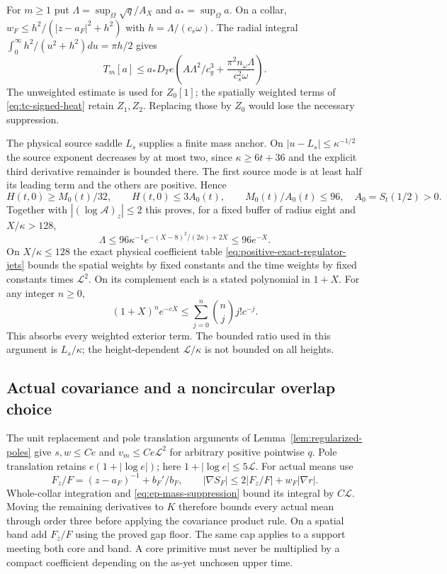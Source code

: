 For $m\ge1$ put $\Lambda=\sup_\Omega\sqrt q/A_X$ and
$a_*=\sup_\Omega a$. On a collar,
$w_F\le h^2/(|z-a_F|^2+h^2)$ with $h=\Lambda/(c_s\omega)$.
The radial integral $\int_0^\infty h^2/(u^2+h^2)du=\pi h/2$ gives
\begin{equation}
 T_m[a]\le a_*D_T e\left(
       A\Lambda^2/c_g^3+\frac{\pi^2 n_\omega\Lambda}{c_s^2\omega}\right).
 \label{eq:ep-weighted-primitive}
\end{equation}
The unweighted estimate is used for $Z_0[1]$; the spatially weighted
terms of \eqref{eq:tc-signed-heat} retain $Z_1,Z_2$.
Replacing those by $Z_0$ would lose the necessary suppression.

The physical source saddle $L_s$ supplies a finite mass anchor.
On $|u-L_s|\le\kappa^{-1/2}$ the source exponent decreases by at
most two, since $\kappa\ge6t+36$ and the explicit third derivative
remainder is bounded there. The first source mode is at least half its
leading term and the others are positive. Hence
\[
 H(t,0)\ge M_0(t)/32,\qquad
 H(t,0)\le3A_0(t),\qquad M_0(t)/A_0(t)\le96,
 \quad A_0=S_t(1/2)>0.
\]
Together with $|(\log\mathcal A)_z|\le2$ this proves, for a fixed
buffer of radius eight and $X/\kappa>128$,
\begin{equation}
 \Lambda\le96\kappa^{-1}
 e^{-(X-8)^2/(2\kappa)+2X}\le96e^{-X}.
 \label{eq:ep-mass-suppression}
\end{equation}
On $X/\kappa\le128$ the exact physical coefficient table
\eqref{eq:positive-exact-regulator-jets} bounds the spatial weights by
fixed constants and the time weights by fixed constants times
$\mathcal L^2$. On its complement each is a stated polynomial in
$1+X$. For any integer $n\ge0$,
\[
 (1+X)^n e^{-cX}\le\sum_{j=0}^n\binom njj!c^{-j}.
\]
This absorbs every weighted exterior term. The bounded ratio used in
this argument is $L_s/\kappa$; the height-dependent
$\mathcal L/\kappa$ is not bounded on all heights.

\subsection{Actual covariance and a noncircular overlap choice}
The unit replacement and pole translation arguments of
Lemma~\ref{lem:regularized-poles} give $s,w\le C e$ and
$v_m\le C e\mathcal L^2$ for arbitrary positive pointwise $q$.
Pole translation retains $e(1+|\log e|)$; here
$1+|\log e|\le5\mathcal L$.
For actual means use
\[
 F_z/F=(z-a_F)^{-1}+b_F'/b_F,
 \qquad |\nabla S_F|\le2|F_z/F|+w_F|\nabla r|.
\]
Whole-collar integration and \eqref{eq:ep-mass-suppression} bound its
integral by $C\mathcal L$. Moving the remaining derivatives to $K$
therefore bounds every actual mean through order three before applying
the covariance product rule. On a spatial band add $F_{\bar z}/F$
using the proved gap floor. The same cap applies to a support meeting
both core and band. A core primitive must never be multiplied by a
compact coefficient depending on the as-yet unchosen upper time.

